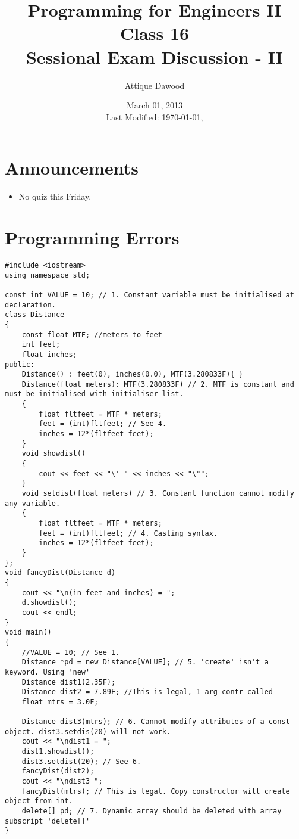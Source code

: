 \documentclass[12pt,a4paper]{article}
\title{\vspace{-2cm}Programming for Engineers II\\Class 16\\Sessional Exam Discussion - II}
\author{Attique Dawood}
\date{March 01, 2013\\[0.2cm] Last Modified: \today, \currenttime}
\begin{document}
\maketitle
\section{Announcements}
\begin{itemize}
\item No quiz this Friday.
\end{itemize}
\section{Programming Errors}
\begin{lstlisting}
#include <iostream>
using namespace std;

const int VALUE = 10; // 1. Constant variable must be initialised at declaration.
class Distance
{
	const float MTF; //meters to feet
	int feet;
	float inches;
public:
	Distance() : feet(0), inches(0.0), MTF(3.280833F){ }
	Distance(float meters): MTF(3.280833F) // 2. MTF is constant and must be initialised with initialiser list.
	{
		float fltfeet = MTF * meters;
		feet = (int)fltfeet; // See 4.
		inches = 12*(fltfeet-feet);
	}
	void showdist()
	{
		cout << feet << "\'-" << inches << "\"";
	}
	void setdist(float meters) // 3. Constant function cannot modify any variable.
	{
		float fltfeet = MTF * meters;
		feet = (int)fltfeet; // 4. Casting syntax.
		inches = 12*(fltfeet-feet);
	}
};
void fancyDist(Distance d)
{
	cout << "\n(in feet and inches) = ";
	d.showdist();
	cout << endl;
}
void main()
{
	//VALUE = 10; // See 1.
	Distance *pd = new Distance[VALUE]; // 5. 'create' isn't a keyword. Using 'new'
	Distance dist1(2.35F); 
	Distance dist2 = 7.89F;	//This is legal, 1-arg contr called
	float mtrs = 3.0F;

	Distance dist3(mtrs); // 6. Cannot modify attributes of a const object. dist3.setdis(20) will not work.
	cout << "\ndist1 = ";
	dist1.showdist();
	dist3.setdist(20); // See 6.
	fancyDist(dist2);
	cout << "\ndist3 ";
	fancyDist(mtrs); // This is legal. Copy constructor will create object from int.
	delete[] pd; // 7. Dynamic array should be deleted with array subscript 'delete[]'
}
\end{lstlisting}


\end{document}
